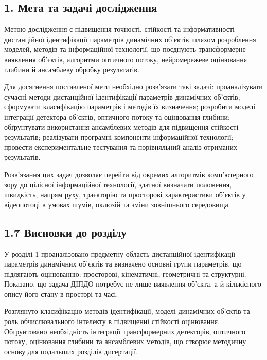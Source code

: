 \documentclass[
]{article}
\begin{document}
\subsection{1. Мета та задачі дослідження}\label{ux43cux435ux442ux430-ux442ux430-ux437ux430ux434ux430ux447ux456-ux434ux43eux441ux43bux456ux434ux436ux435ux43dux43dux44f}

Метою дослідження є підвищення точності, стійкості та інформативності дистанційної ідентифікації параметрів динамічних об'єктів шляхом розроблення моделей, методів та інформаційної технології, що поєднують трансформерне виявлення об'єктів, алгоритми оптичного потоку, нейромережеве оцінювання глибини й ансамблеву обробку результатів.

Для досягнення поставленої мети необхідно розв'язати такі задачі: проаналізувати сучасні методи дистанційної ідентифікації параметрів динамічних об'єктів; сформувати класифікацію параметрів і методів їх визначення; розробити моделі інтеграції детектора об'єктів, оптичного потоку та оцінювання глибини; обґрунтувати використання ансамблевих методів для підвищення стійкості результатів; реалізувати програмні компоненти інформаційної технології; провести експериментальне тестування та порівняльний аналіз отриманих результатів.

Розв'язання цих задач дозволяє перейти від окремих алгоритмів комп'ютерного зору до цілісної інформаційної технології, здатної визначати положення, швидкість, напрям руху, траєкторію та просторові характеристики об'єктів у відеопотоці в умовах шумів, оклюзій та зміни зовнішнього середовища.

\subsection{1.7 Висновки до розділу}\label{ux432ux438ux441ux43dux43eux432ux43aux438-ux434ux43e-ux440ux43eux437ux434ux456ux43bux443}

У розділі 1 проаналізовано предметну область дистанційної ідентифікації параметрів динамічних об'єктів та визначено основні групи параметрів, що підлягають оцінюванню: просторові, кінематичні, геометричні та структурні. Показано, що задача ДІПДО потребує не лише виявлення об'єкта, а й кількісного опису його стану в просторі та часі.

Розглянуто класифікацію методів ідентифікації, моделі динамічних об'єктів та роль обчислювального інтелекту в підвищенні стійкості оцінювання. Обґрунтовано необхідність інтеграції трансформерних детекторів, оптичного потоку, оцінювання глибини та ансамблевих методів, що створює методичну основу для подальших розділів дисертації.
\end{document}
